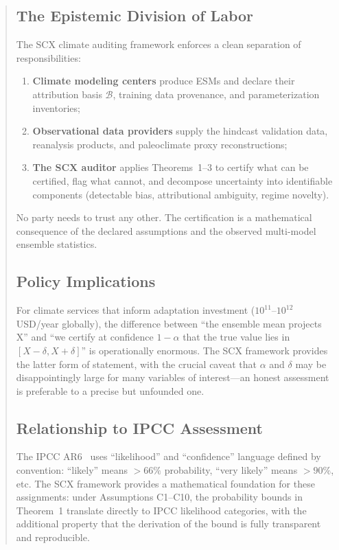 \documentclass[11pt,a4paper]{article}
\theoremstyle{plain}
\theoremstyle{definition}
\theoremstyle{remark}
\begin{document}
\begin{abstract}
\subsection{The Epistemic Division of Labor}
The SCX climate auditing framework enforces a clean separation of
responsibilities:
\begin{enumerate}[label=(\roman*)]
  \item \textbf{Climate modeling centers} produce ESMs and declare their
    attribution basis $\mathcal{B}$, training data provenance, and
    parameterization inventories;
  \item \textbf{Observational data providers} supply the hindcast validation
    data, reanalysis products, and paleoclimate proxy reconstructions;
  \item \textbf{The SCX auditor} applies Theorems~1--3 to certify what can be
    certified, flag what cannot, and decompose uncertainty into identifiable
    components (detectable bias, attributional ambiguity, regime novelty).
\end{enumerate}
No party needs to trust any other. The certification is a mathematical
consequence of the declared assumptions and the observed multi-model ensemble
statistics.
\subsection{Policy Implications}
For climate services that inform adaptation investment ($10^{11}$--$10^{12}$
USD/year globally), the difference between ``the ensemble mean projects X'' and
``we certify at confidence $1-\alpha$ that the true value lies in $[X-\delta,
X+\delta]$'' is operationally enormous. The SCX framework provides the latter
form of statement, with the crucial caveat that $\alpha$ and $\delta$ may be
disappointingly large for many variables of interest---an honest assessment is
preferable to a precise but unfounded one.
\subsection{Relationship to IPCC Assessment}
The IPCC AR6~\cite{ipcc2021} uses ``likelihood'' and ``confidence'' language
defined by convention: ``likely'' means $>66\%$ probability, ``very likely''
means $>90\%$, etc. The SCX framework provides a mathematical foundation for
these assignments: under Assumptions C1--C10, the probability bounds in
Theorem~1 translate directly to IPCC likelihood categories, with the
additional property that the derivation of the bound is fully transparent and
reproducible.

\end{abstract}
\end{document}
